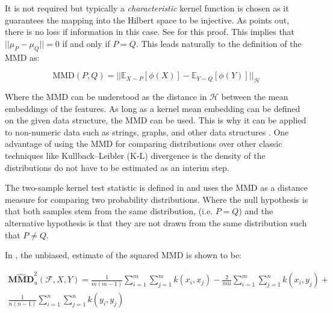 It is not required but typically a \textit{characteristic} kernel function is chosen as it guarantees the mapping into the Hilbert space to be injective. As \cite{muandet2017kernel} points out, there is no loss if information in this case. See \cite{fukumizu2008kernel} for this proof. This implies that $||\mu_P - \mu_Q ||=0$ if and only if $P=Q$. This leads naturally to the definition of the MMD as:

\begin{equation}
\text{MMD}(P,Q)=|| \mathbb{E}_{X \sim P}[\phi(X)] -  \mathbb{E}_{Y \sim Q}[\phi(Y)]||_\mathcal{H}
\end{equation}

Where the MMD can be understood as the distance in $\mathcal{H}$ between the mean embeddings of the features. As long as a kernel mean embedding can be defined on the given data structure, the MMD can be used. This is why it can be applied to non-numeric data such as strings, graphs, and other data structures \cite{hofmann2008kernel}. One advantage of using the MMD for comparing distributions over other classic techniques like Kullback–Leibler (K-L) divergence is the density of the distributions do not have to be estimated as an interim step. 

The two-sample kernel test statistic is defined in \cite{gretton2012kernel} and uses the MMD as a distance measure for comparing two probability distributions. Where the null hypothesis is that both samples stem from the same distribution,  (i.e. $P=Q$) and the alternative hypothesis is that they are not drawn from the same distribution such that $P \neq Q$.

In \cite{gretton2012kernel}, the unbiased, estimate of the squared MMD is shown to be:

\begin{equation}
\begin{split}
\widehat{\mathbf{M M D}}_{u}^{2}(\mathcal{F}, X, Y)=\frac{1}{m(m-1)} \sum_{i=1}^m \sum_{ j=1}^{m} k\left(x_{i}, x_{j}\right)-\frac{2}{m n} \sum_{i=1}^m \sum_{ j=1}^{n} k\left(x_{i}, y_{j}\right)+ \\
\frac{1}{n(n-1)} \sum_{i=1}^n \sum_{j=1}^{n} k\left(y_{i}, y_{j}\right)
\end{split}
\end{equation}



